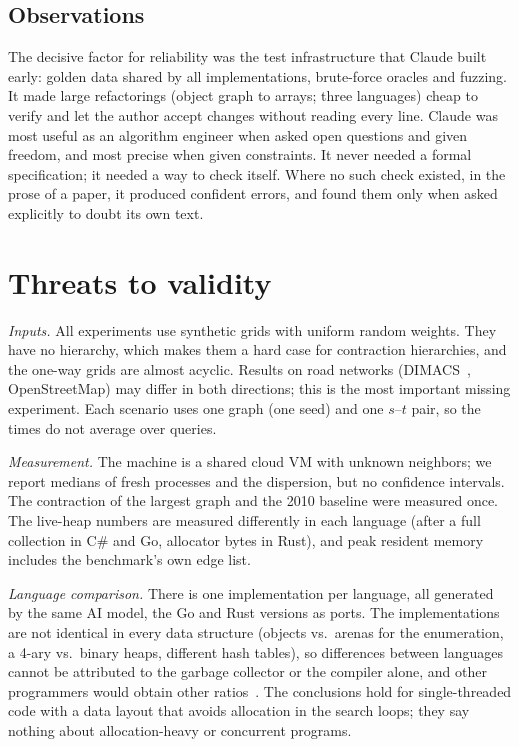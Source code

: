 \documentclass[11pt,a4paper]{article}
\newcommand{\cs}{C\#}
\begin{document}
\subsection{Observations}
The decisive factor for reliability was the test infrastructure that Claude built early: golden data shared by all
implementations, brute-force oracles and fuzzing. It made large refactorings (object graph to arrays; three
languages) cheap to verify and let the author accept changes without reading every line. Claude was most useful as
an algorithm engineer when asked open questions and given freedom, and most precise when given constraints. It never
needed a formal specification; it needed a way to check itself. Where no such check existed, in the prose of a
paper, it produced confident errors, and found them only when asked explicitly to doubt its own text.

\section{Threats to validity}\label{sec:limitations}
\emph{Inputs.} All experiments use synthetic grids with uniform random weights. They have no hierarchy, which makes
them a hard case for contraction hierarchies, and the one-way grids are almost acyclic. Results on road networks
(DIMACS~\cite{dimacs9}, OpenStreetMap) may differ in both directions; this is the most important missing
experiment. Each scenario uses one graph (one seed) and one $s$--$t$ pair, so the times do not average over queries.

\emph{Measurement.} The machine is a shared cloud VM with unknown neighbors; we report medians of fresh processes
and the dispersion, but no confidence intervals. The contraction of the largest graph and the 2010 baseline were
measured once. The live-heap numbers are measured differently in each language (after a full collection in \cs{} and
Go, allocator bytes in Rust), and peak resident memory includes the benchmark's own edge list.

\emph{Language comparison.} There is one implementation per language, all generated by the same AI model, the Go and
Rust versions as ports. The implementations are not identical in every data structure (objects vs.\ arenas for the
enumeration, a 4-ary vs.\ binary heaps, different hash tables), so differences between languages cannot be attributed
to the garbage collector or the compiler alone, and other programmers would obtain other ratios~\cite{prechelt2000}.
The conclusions hold for single-threaded code with a data layout that avoids allocation in the search loops; they
say nothing about allocation-heavy or concurrent programs.
\end{document}
